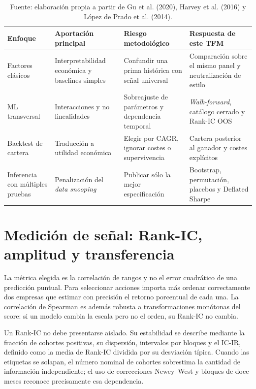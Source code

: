 \begin{table}[H]
\centering
\small
\caption{Posicionamiento metodológico del estudio frente a líneas de literatura relevantes.}
\begin{tabularx}{\textwidth}{lXXX}
\toprule
Enfoque & Aportación principal & Riesgo metodológico & Respuesta de este TFM\\
\midrule
Factores clásicos & Interpretabilidad económica y baselines simples & Confundir una prima histórica con señal universal & Comparación sobre el mismo panel y neutralización de estilo\\
ML transversal & Interacciones y no linealidades & Sobreajuste de parámetros y dependencia temporal & \textit{Walk-forward}, catálogo cerrado y Rank-IC OOS\\
Backtest de cartera & Traducción a utilidad económica & Elegir por CAGR, ignorar costes o supervivencia & Cartera posterior al ganador y costes explícitos\\
Inferencia con múltiples pruebas & Penalización del \textit{data snooping} & Publicar sólo la mejor especificación & Bootstrap, permutación, placebos y Deflated Sharpe\\
\bottomrule
\end{tabularx}
\caption*{Fuente: elaboración propia a partir de Gu et al. (2020), Harvey et al. (2016) y
López de Prado et al. (2014).}
\end{table}

\section{Medición de señal: Rank-IC, amplitud y transferencia}

La métrica elegida es la correlación de rangos y no el error cuadrático de una predicción puntual.
Para seleccionar acciones importa más ordenar correctamente dos empresas que estimar con precisión
el retorno porcentual de cada una. La correlación de Spearman es además robusta a transformaciones
monótonas del score: si un modelo cambia la escala pero no el orden, su Rank-IC no cambia.

Un Rank-IC no debe presentarse aislado. Su estabilidad se describe mediante la fracción de cohortes
positivas, su dispersión, intervalos por bloques y el IC-IR, definido como la media de Rank-IC
dividida por su desviación típica. Cuando las etiquetas se solapan, el número nominal de cohortes
sobrestima la cantidad de información independiente; el uso de correcciones Newey--West y bloques
de doce meses reconoce precisamente esa dependencia.

